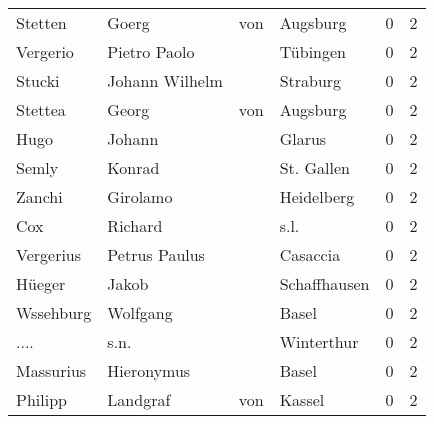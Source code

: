 \documentclass[10pt,a4paper,landscape]{article}
\begin{document}
\begin{longtable}{llllrr}
                  Stetten &                              Goerg &         von &                                    Augsburg &          0 &         2 \\
                 Vergerio &                       Pietro Paolo &             &                                    Tübingen &          0 &         2 \\
                   Stucki &                     Johann Wilhelm &             &                                    Straburg &          0 &         2 \\
                  Stettea &                              Georg &         von &                                    Augsburg &          0 &         2 \\
                     Hugo &                             Johann &             &                                      Glarus &          0 &         2 \\
                    Semly &                             Konrad &             &                                  St. Gallen &          0 &         2 \\
                   Zanchi &                           Girolamo &             &                                  Heidelberg &          0 &         2 \\
                      Cox &                            Richard &             &                                        s.l. &          0 &         2 \\
                Vergerius &                      Petrus Paulus &             &                                    Casaccia &          0 &         2 \\
                   Hüeger &                              Jakob &             &                                Schaffhausen &          0 &         2 \\
                Wssehburg &                           Wolfgang &             &                                       Basel &          0 &         2 \\
                     .... &                               s.n. &             &                                  Winterthur &          0 &         2 \\
                Massurius &                         Hieronymus &             &                                       Basel &          0 &         2 \\
                  Philipp &                           Landgraf &         von &                                      Kassel &          0 &         2 \\

\end{longtable}
\end{document}
